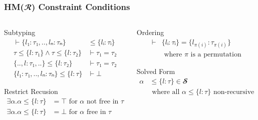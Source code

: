 \documentclass[aspectratio=169]{beamer}
\begin{document}
\begin{frame}[fragile]
  \frametitle{HM($𝓡$) Constraint Conditions}
  \begin{columns}
    \begin{column}{0.5\textwidth}
      \begin{block}{Subtyping}
        \setlength\abovedisplayskip{0pt}
        \begin{align*}
          ⊢ \{l₁ : τ₁, .., lₙ : τₙ\}           & ≤ \{lᵢ : τᵢ\} \\
          τ ≤ \{l : τ₁\} ∧ τ ≤ \{l : τ₂\}      & ⊢ τ₁ = τ₂     \\
          \{.., l : τ₁, ..\} ≤ \{l : τ₂\}      & ⊢ τ₁ = τ₂     \\
          \{l₁ : τ₁, .., lₙ : τₙ\} ≤ \{l : τ\} & ⊢ ⊥
        \end{align*}
      \end{block}
      \begin{block}{Restrict Recusion}
        \setlength\abovedisplayskip{0pt}
        \begin{align*}
          ∃α. α ≤ \{l : τ\} & = ⊤ \text{ for } α \text{ not free in } τ \\
          ∃α. α ≤ \{l : τ\} & = ⊥ \text{ for } α \text{ free in } τ
        \end{align*}
      \end{block}
    \end{column}
    \begin{column}{0.4\textwidth}
      \begin{block}{Ordering}
        \setlength\abovedisplayskip{0pt}
        \begin{align*}
          ⊢ & \{lᵢ : τᵢ\} = \{l_{π(i)} : τ_{π(i)}\}     \\
            & \text{ where } π \text{ is a permutation}
        \end{align*}
      \end{block}
      \begin{block}{Solved Form}
        \setlength\abovedisplayskip{0pt}
        \begin{align*}
          α & ≤ \{l : τ\} ∈ 𝓢                                        \\
            & \text{ where all } α ≤ \{l : τ\} \text{ non-recursive}
        \end{align*}
      \end{block}
    \end{column}
  \end{columns}
\end{frame}
\end{document}
